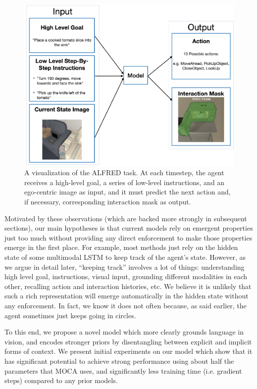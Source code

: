 \documentclass[11pt,a4paper]{article}
\begin{document}
\begin{figure}[H]
\centering
\includegraphics[width=\linewidth]{figures/intro_figure.png}
\caption{A visualization of the ALFRED task. At each timestep, the agent receives a high-level goal, a series of low-level instructions, and an ego-centric image as input, and it must predict the next action and, if necessary, corresponding interaction mask as output.}
\label{fig:intro-figure}
\end{figure}

Motivated by these observations (which are backed more strongly in subsequent sections), our main hypotheses is that current models rely on emergent properties just too much without providing any direct enforcement to make those properties emerge in the first place. For example, most methods just rely on the hidden state of some multimodal LSTM to keep track of the agent's state. However, as we argue in detail later, ``keeping track'' involves a lot of things: understanding high level goal, instructions, visual input, grounding different modalities in each other, recalling action and interaction histories, etc. We believe it is unlikely that such a rich representation will emerge automatically in the hidden state without any enforcement. In fact, we know it does not often because, as said earlier, the agent sometimes just keeps going in circles.

To this end, we propose a novel model which more clearly grounds language in vision, and encodes stronger priors by disentangling between explicit and implicit forms of context. We present initial experiments on our model which show that it has significant potential to achieve strong performance using about half the parameters that MOCA \cite{singh2020moca} uses, and significantly less training time (i.e. gradient steps) compared to any prior models.
\end{document}
